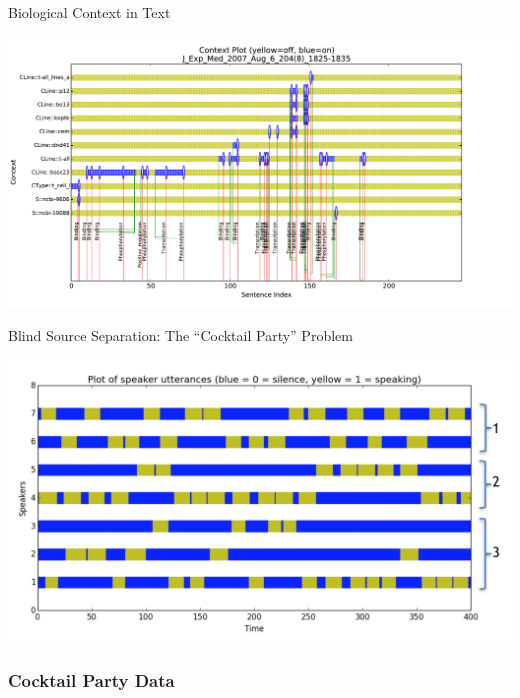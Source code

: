 \documentclass[11pt, mathserif, handout, table]{beamer}
\begin{document}
\begin{frame}{Biological Context in Text}
  \begin{center}
    \includegraphics[width=\textwidth]{img/bio_contexts.pdf}
  \end{center}
\end{frame}

\begin{frame}{Blind Source Separation: The ``Cocktail Party'' Problem}
  \begin{center}
    \includegraphics[width=\textwidth]{img/cocktail-with-groups.png}
  \end{center}
\end{frame}

\begin{frame}
  \frametitle{Cocktail Party Data}
\href{http://research.ics.aalto.fi/ica/cocktail/011001010mix1.wav}{{\color{solarmagenta}{A
  ``Cocktail Party''}}}
\end{frame}

\end{document}
